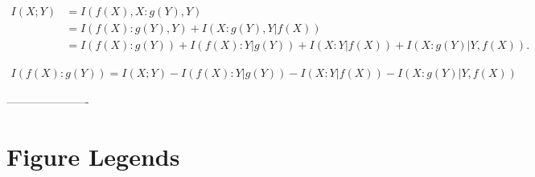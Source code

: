 \documentclass[utf8]{article}
\begin{document}
            
            \begin{align}
                I(X;Y)&= I(f(X),X:g(Y),Y)\\
                &=I(f(X):g(Y),Y)+I(X:g(Y),Y|f(X))\\
                &=I(f(X):g(Y))+I(f(X):Y|g(Y))+ I(X:Y|f(X))+I(X:g(Y)|Y,f(X)).
            \end{align}
            
            \begin{align}
                I(f(X):g(Y))=I(X;Y)-I(f(X):Y|g(Y))- I(X:Y|f(X))-I(X:g(Y)|Y,f(X))
            \end{align}

----------------------
	
	
	
	\section*{Figure Legends}
	\renewcommand{\listfigurename}{~}
    \listoffigures
\end{document}
